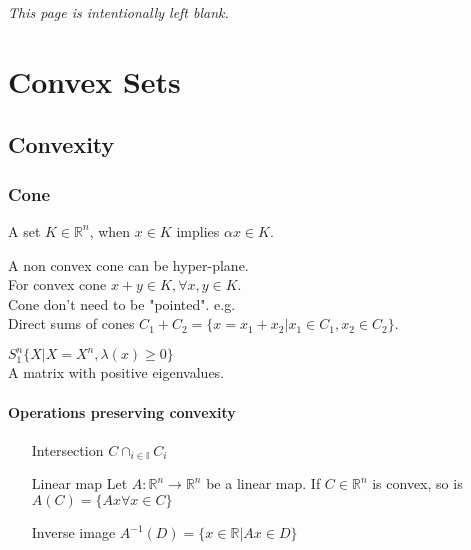\documentclass[11pt,fleqn]{book} %
\def\R{\mathbb{R}}
\begin{document}
\begin{CJK}{UTF8}{gkai}

\pagestyle{fancy} %

\newpage
\thispagestyle{empty}
\centering 
\vspace*{10cm}
\textit{This page is intentionally left blank.}

\chapter{Convex Sets}
\section{Convexity}
\subsection{Cone}
\begin{definition}[Cone]
A set $K \in \R^n$, when $x \in K $ implies $\alpha x \in K$.
\end{definition}
A non convex cone can be hyper-plane.\\
For convex cone $x + y \in K, \forall x,y \in K$.\\
Cone don't need to be "pointed". e.g. \\
Direct sums of cones $C_1 + C_2 = \{ x = x_1+x_2 | x_1 \in C_1, x_2 \in C_2 \}$.\\
\begin{example}
$S_1^n  \{ X | X=X^n ,\lambda(x) \ge 0\}$\\
A matrix with positive eigenvalues.
\end{example}

\subsubsection{Operations preserving convexity}
\begin{itemize}
\item[Intersection] $C  \cap_{i \in \mathbb{I}}C_i$
\item[Linear map] Let $A : \mathbb{R}^n \to  \R^n$ be a linear map. If $C \in \R^n$ is convex, so is $A(C) = \{Ax \forall x \in C \}$
\item[Inverse image] $A^{-1}(D) = \{ x \in \R |Ax \in D \}$
\end{itemize}


\end{CJK}
\end{document}
